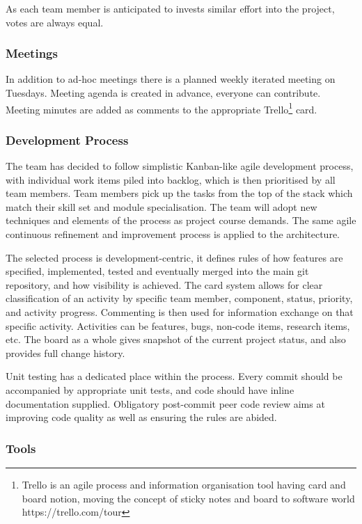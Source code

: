 As each team member is anticipated to invests similar effort into the project, votes are always equal.
\subsubsection {Meetings}
In addition to ad-hoc meetings there is a planned weekly iterated meeting on Tuesdays. Meeting agenda is created in advance, everyone can
contribute. Meeting minutes are added as comments to the appropriate Trello\footnote{Trello is an agile process and information organisation tool having card and board notion, moving the concept of sticky notes and board to software world https://trello.com/tour} card.

\subsubsection{Development Process}

The team has decided to follow simplistic Kanban-like\cite{Ahmed} agile development process, with individual work items piled into backlog,
which is then prioritised by all team members. Team members pick up the tasks from the top of the stack which match their skill set
and module specialisation. The team will adopt new techniques and elements of the process as project course demands.
The same agile continuous refinement and improvement process is applied to the architecture.

The selected process is development-centric, it defines rules of how features are specified, implemented, tested and eventually
merged into the main git repository, and how visibility is achieved. The card system allows for clear classification of an activity by specific team member, component, status, priority, and activity progress. Commenting is then used for information exchange on that specific activity. Activities can be features, bugs, non-code items, research items, etc. The board as a whole gives snapshot of the current project status, and also provides full change history.

Unit testing has a dedicated place within the process. Every commit should be accompanied by appropriate unit tests, and code should have
inline documentation supplied. Obligatory post-commit peer code review aims at improving code quality as well as ensuring the rules are abided.

\subsubsection{Tools}

